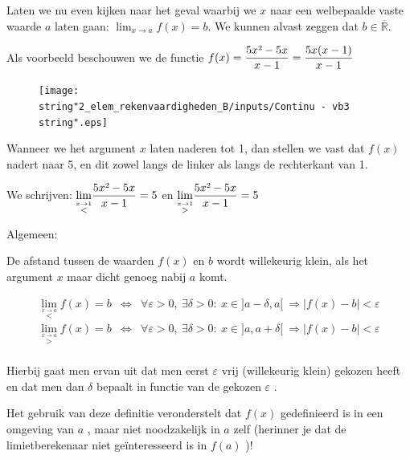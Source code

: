 Laten we nu even kijken naar het geval waarbij we $x$ naar een welbepaalde
vaste waarde $a$ laten gaan: ${\displaystyle \lim_{x\to a}}f(x)=b$.
We kunnen alvast zeggen dat $b\in\overline{\mathbb{R}}$.

\begin{voorbeeld}
	Als voorbeeld beschouwen we de functie $f(x)={\displaystyle \frac{5x\text{\texttwosuperior}-5x}{x-1}}={\displaystyle \frac{5x(x-1)}{x-1}}$ 

\begin{figure}[h]
\centering{}\texttt{[image: \\string"2\_elem\_rekenvaardigheden\_B/inputs/Continu - vb3\\string".eps]} 
\end{figure}

Wanneer we het argument $x$ laten naderen tot 1, dan stellen
we vast dat $f(x)$ nadert naar 5, en dit zowel langs de linker als
langs de rechterkant van 1.




We schrijven: ${\displaystyle \lim_{\overset{x\rightarrow1}{<}}}{\displaystyle \frac{5x\text{\texttwosuperior}-5x}{x-1}}=5$
en ${\displaystyle \lim_{\overset{x\rightarrow1}{>}}}{\displaystyle \frac{5x\text{\texttwosuperior}-5x}{x-1}}=5$ 

\end{voorbeeld}



Algemeen:

De afstand tussen de waarden $f(x)$ en $b$ wordt willekeurig klein,
als het argument $x$ maar dicht genoeg nabij $a$ komt.

\begin{eqnarray*}
{\displaystyle \lim_{\overset{x\rightarrow a}{<}}}f(x)=b & \Leftrightarrow & \forall\varepsilon>0,\:\exists\delta>0:\:x\in]a-\delta,a[\:\Rightarrow\left|f(x)-b\right|<\varepsilon\\
{\displaystyle \lim_{\overset{x\rightarrow a}{>}}}f(x)=b & \Leftrightarrow & \forall\varepsilon>0,\:\exists\delta>0:\:x\in]a,a+\delta[\:\Rightarrow\left|f(x)-b\right|<\varepsilon\\
\end{eqnarray*}


Hierbij gaat men ervan uit dat men eerst $\varepsilon$ vrij (willekeurig
klein) gekozen heeft en dat men dan $\delta$ bepaalt in functie van
de gekozen $\varepsilon$ .

Het gebruik van deze definitie veronderstelt dat $f(x)$ gedefinieerd
is in een omgeving van $a$ , maar niet noodzakelijk in $a$ zelf
(herinner je dat de limietberekenaar niet ge\"interesseerd is in $f(a)$
)! 




